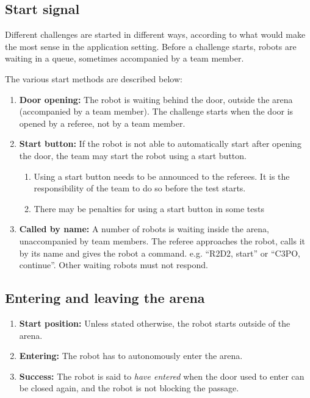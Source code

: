 \subsection{Start signal}
\label{rule:start_signal}

Different challenges are started in different ways, according to what would make the most sense in the application setting. 
Before a challenge starts, robots are waiting in a queue, sometimes accompanied by a team member. 

The various start methods are described below:
\begin{enumerate}
	\item \textbf{Door opening:} The robot is waiting behind the door, outside the arena (accompanied by a team member). The challenge starts when the door is opened by a referee, not by a team member. 
	\item \textbf{Start button:} If the robot is not able to automatically start after opening the door, the team may start the robot using a start button. 
	\begin{enumerate}
		\item Using a start button needs to be announced to the referees. It is the responsibility of the team to do so before the test starts.
		\item There may be penalties for using a start button in some tests
	\end{enumerate}
    \item \textbf{Called by name:} A number of robots is waiting inside the arena, unaccompanied by team members. 
				      The referee approaches the robot, calls it by its name and gives the robot a command. e.g. ``R2D2, start'' or ``C3PO, continue''.
				      Other waiting robots must not respond. 
\end{enumerate}


\subsection{Entering and leaving the arena}
\label{rule:start_position}
\begin{enumerate}
	\item \textbf{Start position:} Unless stated otherwise, the robot starts outside of the arena.
	\item \textbf{Entering:} The robot has to autonomously enter the arena.
	\item \textbf{Success:} The robot is said to \emph{have entered} when the door used to enter can be closed again, and the robot is not blocking the passage.
\end{enumerate}



